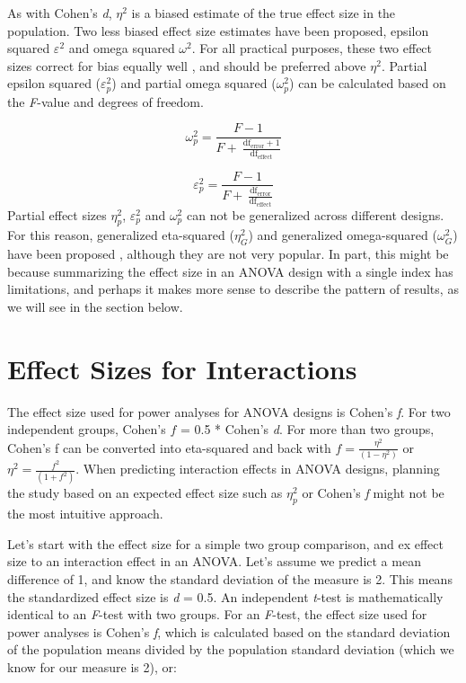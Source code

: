 \documentclass[
]{krantz}
\begin{document}
As with Cohen's \emph{d}, \(\eta^2\) is a biased estimate of the true effect size in the population. Two less biased effect size estimates have been proposed, epsilon squared \(\varepsilon^{2}\) and omega squared \(\omega^{2}\). For all practical purposes, these two effect sizes correct for bias equally well \citep{okada_is_2013, albers_when_2018}, and should be preferred above \(\eta^2\). Partial epsilon squared (\(\varepsilon_{p}^{2}\)) and partial omega squared (\(\omega_{p}^{2}\)) can be calculated based on the \emph{F}-value and degrees of freedom.

\[
\omega_{p}^{2} = \frac{F - 1}{F + \ \frac{\text{df}_{\text{error}} + 1}{\text{df}_{\text{effect}}}}
\]

\[
\varepsilon_{p}^{2} = \frac{F - 1}{F + \ \frac{\text{df}_{\text{error}}}{\text{df}_{\text{effect}}}}
\]
Partial effect sizes \(\eta_{p}^{2}\), \(\varepsilon_{p}^{2}\) and \(\omega_{p}^{2}\) can not be generalized across different designs. For this reason, generalized eta-squared (\(\eta_{G}^{2}\)) and generalized omega-squared (\(\omega_{G}^{2}\)) have been proposed \citep{olejnik_generalized_2003}, although they are not very popular. In part, this might be because summarizing the effect size in an ANOVA design with a single index has limitations, and perhaps it makes more sense to describe the pattern of results, as we will see in the section below.

\hypertarget{effect-sizes-for-interactions}{%
\section{Effect Sizes for Interactions}\label{effect-sizes-for-interactions}}

The effect size used for power analyses for ANOVA designs is Cohen's \emph{f}. For two independent groups, Cohen's \(f\) = 0.5 * Cohen's \emph{d}. For more than two groups, Cohen's f can be converted into eta-squared and back with \(f = \frac{\eta^2}{(1 - \eta^2)}\) or \(\eta^2 = \frac{f^2}{(1 + f^2)}\). When predicting interaction effects in ANOVA designs, planning the study based on an expected effect size such as \(\eta_{p}^{2}\) or Cohen's \emph{f} might not be the most intuitive approach.

Let's start with the effect size for a simple two group comparison, and ex effect size to an interaction effect in an ANOVA. Let's assume we predict a mean difference of 1, and know the standard deviation of the measure is 2. This means the standardized effect size is \emph{d} = 0.5. An independent \emph{t}-test is mathematically identical to an \emph{F}-test with two groups. For an \emph{F}-test, the effect size used for power analyses is Cohen's \emph{f}, which is calculated based on the standard deviation of the population means divided by the population standard deviation (which we know for our measure is 2), or:
\end{document}
